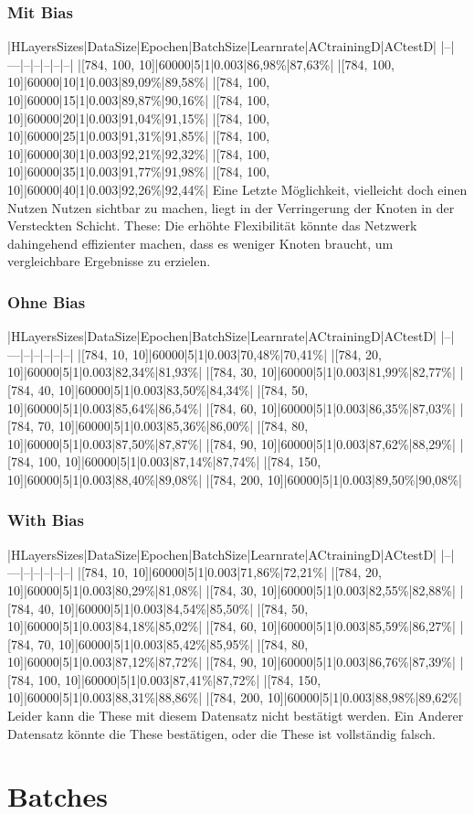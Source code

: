 \documentclass[12pt]{article}
\begin{document}
\subsubsection{ Mit Bias}|HLayersSizes|DataSize|Epochen|BatchSize|Learnrate|ACtrainingD|ACtestD|
|--|---|--|--|--|--|--|
|[784, 100, 10]|60000|5|1|0.003|86,98\%|87,63\%|
|[784, 100, 10]|60000|10|1|0.003|89,09\%|89,58\%|
|[784, 100, 10]|60000|15|1|0.003|89,87\%|90,16\%|
|[784, 100, 10]|60000|20|1|0.003|91,04\%|91,15\%|
|[784, 100, 10]|60000|25|1|0.003|91,31\%|91,85\%|
|[784, 100, 10]|60000|30|1|0.003|92,21\%|92,32\%|
|[784, 100, 10]|60000|35|1|0.003|91,77\%|91,98\%|
|[784, 100, 10]|60000|40|1|0.003|92,26\%|92,44\%|
Eine Letzte Möglichkeit, vielleicht doch einen Nutzen Nutzen sichtbar zu machen, liegt in der Verringerung der Knoten in der Versteckten Schicht. 
These: Die erhöhte Flexibilität könnte das Netzwerk dahingehend effizienter machen, dass es weniger Knoten braucht, um vergleichbare Ergebnisse zu erzielen.\subsubsection{ Ohne Bias}|HLayersSizes|DataSize|Epochen|BatchSize|Learnrate|ACtrainingD|ACtestD|
|--|---|--|--|--|--|--|
|[784, 10, 10]|60000|5|1|0.003|70,48\%|70,41\%|
|[784, 20, 10]|60000|5|1|0.003|82,34\%|81,93\%|
|[784, 30, 10]|60000|5|1|0.003|81,99\%|82,77\%|
|[784, 40, 10]|60000|5|1|0.003|83,50\%|84,34\%|
|[784, 50, 10]|60000|5|1|0.003|85,64\%|86,54\%|
|[784, 60, 10]|60000|5|1|0.003|86,35\%|87,03\%|
|[784, 70, 10]|60000|5|1|0.003|85,36\%|86,00\%|
|[784, 80, 10]|60000|5|1|0.003|87,50\%|87,87\%|
|[784, 90, 10]|60000|5|1|0.003|87,62\%|88,29\%|
|[784, 100, 10]|60000|5|1|0.003|87,14\%|87,74\%|
|[784, 150, 10]|60000|5|1|0.003|88,40\%|89,08\%|
|[784, 200, 10]|60000|5|1|0.003|89,50\%|90,08\%|
\subsubsection{ With Bias}|HLayersSizes|DataSize|Epochen|BatchSize|Learnrate|ACtrainingD|ACtestD|
|--|---|--|--|--|--|--|
|[784, 10, 10]|60000|5|1|0.003|71,86\%|72,21\%|
|[784, 20, 10]|60000|5|1|0.003|80,29\%|81,08\%|
|[784, 30, 10]|60000|5|1|0.003|82,55\%|82,88\%|
|[784, 40, 10]|60000|5|1|0.003|84,54\%|85,50\%|
|[784, 50, 10]|60000|5|1|0.003|84,18\%|85,02\%|
|[784, 60, 10]|60000|5|1|0.003|85,59\%|86,27\%|
|[784, 70, 10]|60000|5|1|0.003|85,42\%|85,95\%|
|[784, 80, 10]|60000|5|1|0.003|87,12\%|87,72\%|
|[784, 90, 10]|60000|5|1|0.003|86,76\%|87,39\%|
|[784, 100, 10]|60000|5|1|0.003|87,41\%|87,72\%|
|[784, 150, 10]|60000|5|1|0.003|88,31\%|88,86\%|
|[784, 200, 10]|60000|5|1|0.003|88,98\%|89,62\%|
Leider kann die These mit diesem Datensatz nicht bestätigt werden. Ein Anderer Datensatz könnte die These bestätigen, oder die These ist vollständig falsch.\section{ Batches}
\end{document}
